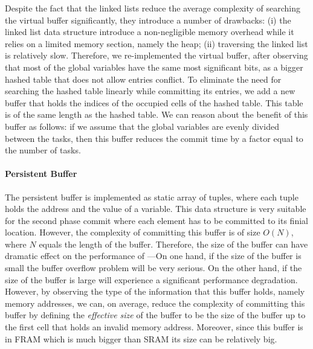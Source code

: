 			Despite the fact that the linked lists reduce the average complexity of searching the virtual buffer significantly, they introduce a number of drawbacks: (i) the linked list data structure introduce a non-negligible memory overhead while it relies on a limited memory section, namely the heap; (ii) traversing the linked list is relatively slow. Therefore, we re-implemented the virtual buffer, after observing that most of the global variables have the same most significant bits, as a bigger hashed table that does not allow entries conflict. To eliminate the need for searching the hashed table linearly while committing its entries, we add a new buffer that holds the indices of the occupied cells of the hashed table. This table is of the same length as the hashed table. We can reason about the benefit of this buffer as follows: if we assume that the global variables are evenly divided between the tasks, then this buffer reduces the commit time by a factor equal to the number of tasks.   

		\paragraph{Persistent Buffer}
			The persistent buffer is implemented as static array of tuples, where each tuple holds  the address and the value of a variable. This data structure is very suitable for the second phase commit where each element has to be committed to its finial location. However, the complexity of committing this buffer is of size $O(N)$, where $N$ equals the length of the buffer. Therefore, the size of the buffer can have dramatic effect on the performance of \sys---On one hand, if the size of the buffer is small the buffer overflow problem will be very serious. On the other hand, if the size of the buffer is large \sys will experience a significant performance degradation. However, by observing the type of the information that this buffer holds, namely memory addresses, we can, on average, reduce the complexity of committing this buffer by defining the \emph{effective size} of the buffer to be the size of the buffer up to the first cell that holds an invalid memory address. Moreover, since this buffer is in FRAM which is much bigger than SRAM its size can be relatively big. 


